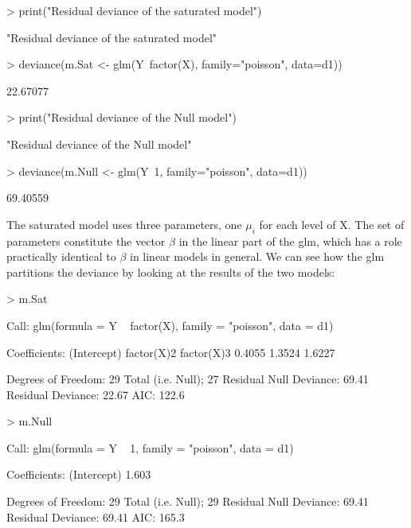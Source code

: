 \documentclass{article}
\begin{document}
\begin{Schunk}
\begin{Sinput}
> print("Residual deviance of the saturated model")
\end{Sinput}
\begin{Soutput}
[1] "Residual deviance of the saturated model"
\end{Soutput}
\begin{Sinput}
> deviance(m.Sat <- glm(Y~factor(X), family="poisson", data=d1))
\end{Sinput}
\begin{Soutput}
[1] 22.67077
\end{Soutput}
\begin{Sinput}
> print("Residual deviance of the Null model")
\end{Sinput}
\begin{Soutput}
[1] "Residual deviance of the Null model"
\end{Soutput}
\begin{Sinput}
> deviance(m.Null <- glm(Y~1, family="poisson", data=d1))
\end{Sinput}
\begin{Soutput}
[1] 69.40559
\end{Soutput}
\end{Schunk}

The saturated model uses three parameters, one $\mu_i$ for each level of X. The set of parameters constitute the vector \textbf{$\beta$} in the linear part of the glm, which has a role practically identical to \textbf{ $\beta$} in linear models in general. We can see how the glm partitions the deviance by looking at the results of the two models:

\begin{Schunk}
\begin{Sinput}
> m.Sat
\end{Sinput}
\begin{Soutput}
Call:  glm(formula = Y ~ factor(X), family = "poisson", data = d1)

Coefficients:
(Intercept)   factor(X)2   factor(X)3  
     0.4055       1.3524       1.6227  

Degrees of Freedom: 29 Total (i.e. Null);  27 Residual
Null Deviance:	    69.41 
Residual Deviance: 22.67 	AIC: 122.6
\end{Soutput}
\begin{Sinput}
> m.Null
\end{Sinput}
\begin{Soutput}
Call:  glm(formula = Y ~ 1, family = "poisson", data = d1)

Coefficients:
(Intercept)  
      1.603  

Degrees of Freedom: 29 Total (i.e. Null);  29 Residual
Null Deviance:	    69.41 
Residual Deviance: 69.41 	AIC: 165.3
\end{Soutput}
\end{Schunk}
\end{document}

